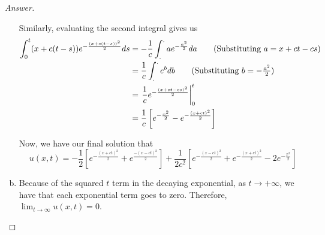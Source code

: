 \documentclass{article}
\theoremstyle{definition}
\renewcommand\qedsymbol{$\blacksquare$}
\newenvironment{ans}{\begin{proof}[Answer]\renewcommand{\qedsymbol}{}}{\end{proof}}
\begin{document}
\begin{ans}
\begin{enumerate}[a)]
        Similarly, evaluating the second integral gives us
        \begin{align*}
            \int_0^t(x+c(t-s))e^{-\frac{(x+c(t-s))^2}{2}}ds &= -\frac{1}{c} \int_.^. ae^{-\frac{a^2}{2}}da \tag{Substituting $a=x+ct-cs$}\\
            &= \frac{1}{c} \int_.^. e^{b}db \tag{Substituting $b = -\frac{a^2}{2}$}\\
            &= \left.\frac{1}{c}e^{-\frac{(x+ct-cs)^2}{2}}\right|_0^t\\
            &= \frac{1}{c}\left[e^{-\frac{x^2}{2}} - e^{-\frac{(x+ct)^2}{2}}\right]
        \end{align*}

        Now, we have our final solution that
        \[\boxed{u(x,t) = -\frac{1}{2}\left[e^{-\frac{(x+ct)^2}{2}} + e^{\frac{-(x-ct)^2}{2}}\right] + \frac{1}{2c^2}\left[e^{-\frac{(x-ct)^2}{2}} + e^{-\frac{(x+ct)^2}{2}} -2e^{-\frac{x^2}{2}}\right]}\]

        \item Because of the squared $t$ term in the decaying exponential, as $t\to +\infty$, we have that each exponential term goes to zero. Therefore, $\lim_{t\to\infty}u(x,t) = 0$.
    \end{enumerate}
    \end{ans}

    
		
	
\end{document}
